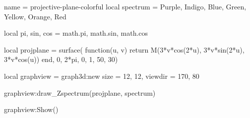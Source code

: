\documentclass{standalone}
\begin{document}
\begin{luadraw}{name = projective-plane-colorful}
local spectrum = {Purple, Indigo, Blue, Green, Yellow, Orange, Red}

local pi, sin, cos = math.pi, math.sin, math.cos

local projplane = surface(
  function(u, v)
    return M(3*v*cos(2*u), 3*v*sin(2*u), 3*v*cos(u))
  end,
  0, 2*pi, 0, 1,
  {50, 30})

local graphview = graph3d:new{
  size    = {12, 12},
  viewdir = {170, 80}
}

graphview:draw_Zspectrum(projplane, spectrum)

graphview:Show()
\end{luadraw}
\end{document}
